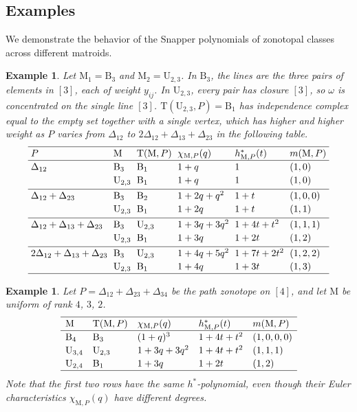 \documentclass[11pt,a4paper,reqno]{amsart}
\theoremstyle{results}
\theoremstyle{definitions}
\newtheorem{example}[thm]{Example}
\newcommand{\B}{\textrm{B}}
\newcommand{\M}{\mathrm{M}}
\newcommand{\hstar}{h^{*}}
\newcommand{\DT}{\mathrm{T}}      %
\newcommand{\U}{\mathrm{U}}
\begin{document}
\subsection{Examples} We demonstrate the behavior of the Snapper polynomials of zonotopal classes across different matroids. 
\label{sec:examples}
\begin{example}\label{ex:small}
  Let $\M_1 = \B_3$ and
  $\M_2 = \U_{2,3}$. In $\B_3$, the lines are the three pairs of elements in $[3]$, each of
  weight $y_{ij}$. In $\U_{2,3}$, every pair has closure $[3]$, so $\omega$ is concentrated on the single line $[3]$. $\DT(\U_{2, 3},P) = \B_1$ has independence complex equal to the empty set together with a
  single vertex, which has higher and higher weight as $P$ varies from $\Delta_{12}$ to $2\Delta_{12} + \Delta_{13} + \Delta_{23}$ in the following table.
  {\footnotesize
  \[
    \setlength{\arraycolsep}{3pt}
    \renewcommand{\arraystretch}{1.15}
    \begin{array}{llllll}
      \hline
      P & \M & \DT(\M,P) & \chi_{\M,P}(q) & \hstar_{\M,P}(t) & m(\M,P) \\
      \hline
      \Delta_{12}
        & \B_3 & \B_1 & 1 + q & 1 & (1,0) \\
        & \U_{2,3} & \B_1 & 1 + q & 1 & (1,0) \\[2pt] \hline
      \Delta_{12} + \Delta_{23}
        & \B_3 & \B_2 & 1 + 2q + q^2 & 1 + t & (1,0,0) \\
        & \U_{2,3} & \B_1  & 1 + 2q & 1 + t & (1,1) \\[2pt] \hline
      \Delta_{12} + \Delta_{13} + \Delta_{23}
        & \B_3 & \U_{2,3} & 1 + 3q + 3q^2 & 1 + 4t + t^2 & (1,1,1) \\
        & \U_{2,3} & \B_1  & 1 + 3q & 1 + 2t & (1,2) \\[2pt] \hline
      2\Delta_{12} + \Delta_{13} + \Delta_{23}
        & \B_3 & \U_{2,3} & 1 + 4q + 5q^2 & 1 + 7t + 2t^2 & (1,2,2) \\
        & \U_{2,3} & \B_1 & 1 + 4q & 1 + 3t & (1,3) \\
      \hline
    \end{array}
  \]}
\end{example}

\begin{example}\label{ex:path}
   Let $P = \Delta_{12} + \Delta_{23} + \Delta_{34}$ be the path zonotope on $[4]$,
   and let $\M$ be uniform of rank $4$, $3$, $2$.
   \[
    \renewcommand{\arraystretch}{1.15}
    \begin{array}{lllll}
      \hline
      \M & \DT(\M,P) & \chi_{\M,P}(q) & \hstar_{\M,P}(t) & m(\M,P) \\
      \hline
      \B_4 & \B_3 & (1+q)^3 & 1 + 4t + t^2 & (1,0,0,0) \\
      \U_{3,4} & \U_{2,3} & 1 + 3q + 3q^2 & 1 + 4t + t^2 & (1,1,1) \\
      \U_{2,4} & \B_1 & 1 + 3q & 1 + 2t & (1,2) \\
      \hline
    \end{array}
  \]
  Note that the first two rows have the same $\hstar$-polynomial, even though their
  Euler characteristics $\chi_{\M, P}(q)$ have different degrees.
\end{example}
\end{document}
